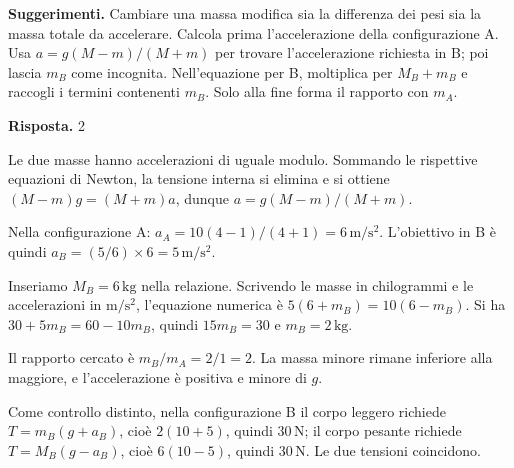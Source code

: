 \documentclass[11pt,a4paper]{article}
\begin{document}
\begin{samepage}
{\small\textbf{Suggerimenti.} Cambiare una massa modifica sia la differenza dei pesi sia la massa totale da accelerare. Calcola prima l’accelerazione della configurazione A. Usa \(a=g(M-m)/(M+m)\) per trovare l’accelerazione richiesta in B; poi lascia \(m_B\) come incognita. Nell’equazione per B, moltiplica per \(M_B+m_B\) e raccogli i termini contenenti \(m_B\). Solo alla fine forma il rapporto con \(m_A\).\par}
\medskip\noindent\textbf{Risposta.} 2\par


Le due masse hanno accelerazioni di uguale modulo. Sommando le rispettive equazioni di Newton, la tensione interna si elimina e si ottiene \((M-m)g=(M+m)a\), dunque \(a=g(M-m)/(M+m)\).\par

Nella configurazione A: \(a_A=10(4-1)/(4+1)=6\,\mathrm{m/s^2}\). L’obiettivo in B è quindi \(a_B=(5/6)\times6=5\,\mathrm{m/s^2}\).\par

Inseriamo \(M_B=6\,\mathrm{kg}\) nella relazione. Scrivendo le masse in chilogrammi e le accelerazioni in \(\mathrm{m/s^2}\), l’equazione numerica è \(5(6+m_B)=10(6-m_B)\). Si ha \(30+5m_B=60-10m_B\), quindi \(15m_B=30\) e \(m_B=2\,\mathrm{kg}\).\par

Il rapporto cercato è \(m_B/m_A=2/1=2\). La massa minore rimane inferiore alla maggiore, e l’accelerazione è positiva e minore di \(g\).\par

Come controllo distinto, nella configurazione B il corpo leggero richiede \(T=m_B(g+a_B)\), cioè \(2(10+5)\), quindi \(30\,\mathrm{N}\); il corpo pesante richiede \(T=M_B(g-a_B)\), cioè \(6(10-5)\), quindi \(30\,\mathrm{N}\). Le due tensioni coincidono.\par

\end{samepage}
\newpage
\end{document}

